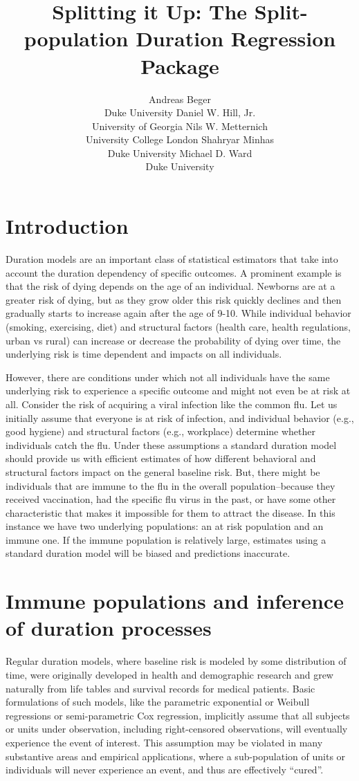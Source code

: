 \documentclass[article]{jss}
\author{
Andreas Beger\\Duke University \And Daniel W. Hill, Jr.\\University of Georgia \And Nils W. Metternich\\University College London \AND Shahryar Minhas\\Duke University \And Michael D. Ward\\Duke University
}
\title{Splitting it Up: The \pkg{spduration} Split-population Duration
Regression Package}
\begin{document}
\section{Introduction}

Duration models are an important class of statistical estimators that
take into account the duration dependency of specific outcomes. A
prominent example is that the risk of dying depends on the age of an
individual. Newborns are at a greater risk of dying, but as they grow
older this risk quickly declines and then gradually starts to increase
again after the age of 9-10. While individual behavior (smoking,
exercising, diet) and structural factors (health care, health
regulations, urban vs rural) can increase or decrease the probability of
dying over time, the underlying risk is time dependent and impacts on
all individuals.

However, there are conditions under which not all individuals have the
same underlying risk to experience a specific outcome and might not even
be at risk at all. Consider the risk of acquiring a viral infection like
the common flu. Let us initially assume that everyone is at risk of
infection, and individual behavior (e.g., good hygiene) and structural
factors (e.g., workplace) determine whether individuals catch the flu.
Under these assumptions a standard duration model should provide us with
efficient estimates of how different behavioral and structural factors
impact on the general baseline risk. But, there might be individuals
that are immune to the flu in the overall population--because they
received vaccination, had the specific flu virus in the past, or have
some other characteristic that makes it impossible for them to attract
the disease. In this instance we have two underlying populations: an at
risk population and an immune one. If the immune population is
relatively large, estimates using a standard duration model will be
biased and predictions inaccurate.

\section{Immune populations and inference of duration
processes}

Regular duration models, where baseline risk is modeled by some
distribution of time, were originally developed in health and
demographic research and grew naturally from life tables and survival
records for medical patients. Basic formulations of such models, like
the parametric exponential or Weibull regressions or semi-parametric Cox
regression, implicitly assume that all subjects or units under
observation, including right-censored observations, will eventually
experience the event of interest. This assumption may be violated in
many substantive areas and empirical applications, where a
sub-population of units or individuals will never experience an event,
and thus are effectively ``cured''.
\end{document}
